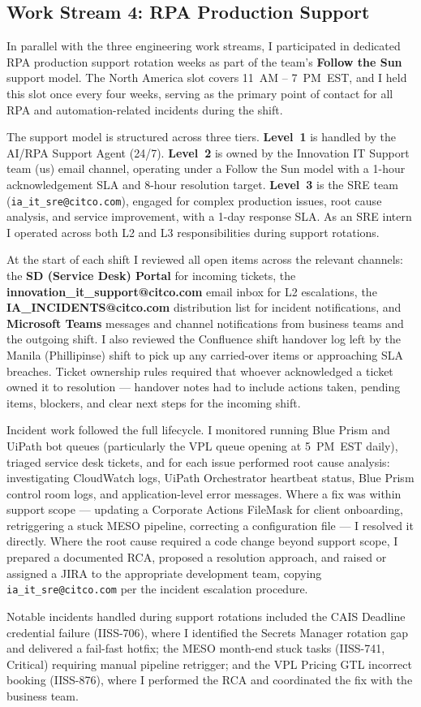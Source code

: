 \subsection{Work Stream 4: RPA Production Support}

In parallel with the three engineering work streams, I participated in
dedicated RPA production support rotation weeks as part of the team's
\textbf{Follow the Sun} support model. The North America slot covers
11~AM -- 7~PM~EST, and I held this slot once every four weeks, serving
as the primary point of contact for all RPA and automation-related
incidents during the shift.

The support model is structured across three tiers. \textbf{Level~1} is
handled by the AI/RPA Support Agent (24/7). \textbf{Level~2} is owned by
the Innovation IT Support team (us) email channel, operating under
a Follow the Sun model with a 1-hour acknowledgement SLA and 8-hour
resolution target. \textbf{Level~3} is the SRE team
(\texttt{ia\_it\_sre@citco.com}), engaged for complex production issues,
root cause analysis, and service improvement, with a 1-day response SLA.
As an SRE intern I operated across both L2 and L3 responsibilities during
support rotations.

At the start of each shift I reviewed all open items across the relevant
channels: the \textbf{SD (Service Desk) Portal} for incoming tickets, the
\textbf{innovation\_it\_support@citco.com} email inbox for L2 escalations,
the \textbf{IA\_INCIDENTS@citco.com} distribution list for incident
notifications, and \textbf{Microsoft Teams} messages and channel
notifications from business teams and the outgoing shift. I also reviewed
the Confluence shift handover log left by the Manila (Phillipinse) shift to 
pick up any carried-over items or approaching SLA breaches. Ticket ownership rules
required that whoever acknowledged a ticket owned it to resolution ---
handover notes had to include actions taken, pending items, blockers, and
clear next steps for the incoming shift.

Incident work followed the full lifecycle. I monitored running Blue Prism
and UiPath bot queues (particularly the VPL queue opening at 5~PM~EST
daily), triaged service desk tickets, and for each issue performed root
cause analysis: investigating CloudWatch logs, UiPath Orchestrator
heartbeat status, Blue Prism control room logs, and application-level
error messages. Where a fix was within support scope --- updating a
Corporate Actions FileMask for client onboarding, retriggering a stuck
MESO pipeline, correcting a configuration file --- I resolved it directly.
Where the root cause required a code change beyond support scope, I
prepared a documented RCA, proposed a resolution approach, and raised or
assigned a JIRA to the appropriate development team, copying \texttt{ia\_it\_sre@citco.com} per
the incident escalation procedure.

Notable incidents handled during support rotations included the CAIS
Deadline credential failure (IISS-706), where I identified the Secrets
Manager rotation gap and delivered a fail-fast hotfix; the MESO month-end
stuck tasks (IISS-741, Critical) requiring manual pipeline retrigger; and
the VPL Pricing GTL incorrect booking (IISS-876), where I performed the
RCA and coordinated the fix with the business team.
